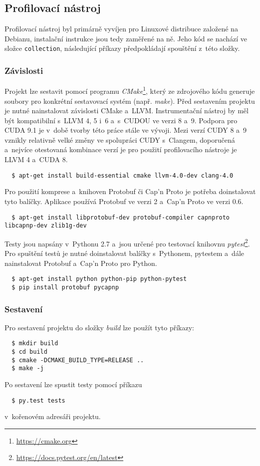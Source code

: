 \subsection{Profilovací nástroj}
Profilovací nástroj byl primárně vyvíjen pro Linuxové distribuce založené na Debianu, instalační instrukce jsou tedy zaměřené na ně. Jeho kód se nachází ve složce \texttt{collection}, následující příkazy předpokládají spouštění z~této složky. 

\subsubsection{Závislosti}
Projekt lze sestavit pomocí programu \emph{CMake}\footnote{\url{https://cmake.org}}, který ze zdrojového kódu generuje soubory pro konkrétní sestavovací systém (např. \emph{make}). Před sestavením projektu je nutné nainstalovat závislosti CMake a~LLVM. Instrumentační nástroj by měl být kompatibilní s~LLVM 4, 5 i~6 a~s~CUDOU ve verzi 8 a~9. Podpora pro CUDA 9.1 je v~době tvorby této práce stále ve vývoji.
Mezi verzí CUDY 8 a~9 vznikly relativně velké změny ve spolupráci CUDY s~Clangem, doporučená a~nejvíce otestovaná kombinace verzí je pro použití profilovacího nástroje je LLVM 4 a~CUDA 8.
\begin{verbatim}
  $ apt-get install build-essential cmake llvm-4.0-dev clang-4.0
\end{verbatim}
Pro použití komprese a~knihoven Protobuf či Cap'n Proto je potřeba doinstalovat tyto balíčky. Aplikace používá Protobuf ve verzi 2 a~Cap'n Proto ve verzi 0.6.
\begin{verbatim}
  $ apt-get install libprotobuf-dev protobuf-compiler capnproto libcapnp-dev zlib1g-dev
\end{verbatim}
Testy jsou napsány v~Pythonu 2.7 a~jsou určené pro testovací knihovnu \emph{pytest}\footnote{\url{https://docs.pytest.org/en/latest}}. Pro spuštění testů je nutné doinstalovat balíčky s~Pythonem, pytestem a~dále nainstalovat Protobuf a~Cap'n Proto pro Python.
\begin{verbatim}
  $ apt-get install python python-pip python-pytest
  $ pip install protobuf pycapnp
\end{verbatim}

\subsubsection{Sestavení}
Pro sestavení projektu do složky \emph{build} lze použít tyto příkazy:

\begin{verbatim}
  $ mkdir build
  $ cd build
  $ cmake -DCMAKE_BUILD_TYPE=RELEASE ..
  $ make -j
\end{verbatim}
Po sestavení lze spustit testy pomocí příkazu
\begin{verbatim}
  $ py.test tests
\end{verbatim}
v~kořenovém adresáři projektu.

